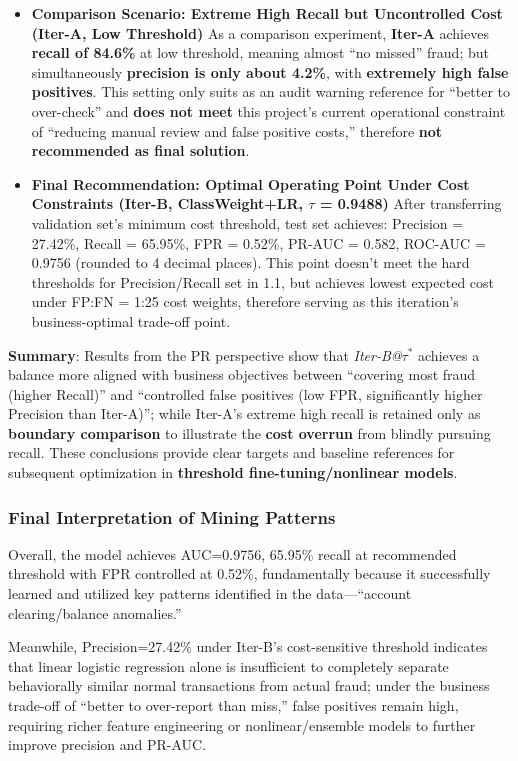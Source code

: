 \documentclass[sigplan,screen]{acmart}
\begin{document}
\begin{itemize}
\item \textbf{Comparison Scenario: Extreme High Recall but Uncontrolled Cost (Iter-A, Low Threshold)} As a comparison experiment, \textbf{Iter-A} achieves \textbf{recall of 84.6\%} at low threshold, meaning almost ``no missed'' fraud; but simultaneously \textbf{precision is only about 4.2\%}, with \textbf{extremely high false positives}. This setting only suits as an audit warning reference for ``better to over-check'' and \textbf{does not meet} this project's current operational constraint of ``reducing manual review and false positive costs,'' therefore \textbf{not recommended as final solution}.

\item \textbf{Final Recommendation: Optimal Operating Point Under Cost Constraints (Iter-B, ClassWeight+LR, $\tau$ = 0.9488)} After transferring validation set's minimum cost threshold, test set achieves: Precision = 27.42\%, Recall = 65.95\%, FPR = 0.52\%, PR-AUC = 0.582, ROC-AUC = 0.9756 (rounded to 4 decimal places). This point doesn't meet the hard thresholds for Precision/Recall set in 1.1, but achieves lowest expected cost under FP:FN = 1:25 cost weights, therefore serving as this iteration's business-optimal trade-off point.
\end{itemize}

\textbf{Summary}: Results from the PR perspective show that \textit{Iter-B@$\tau^*$} achieves a balance more aligned with business objectives between ``covering most fraud (higher Recall)'' and ``controlled false positives (low FPR, significantly higher Precision than Iter-A)''; while Iter-A's extreme high recall is retained only as \textbf{boundary comparison} to illustrate the \textbf{cost overrun} from blindly pursuing recall. These conclusions provide clear targets and baseline references for subsequent optimization in \textbf{threshold fine-tuning/nonlinear models}.

\subsubsection{Final Interpretation of Mining Patterns}

Overall, the model achieves AUC=0.9756, 65.95\% recall at recommended threshold with FPR controlled at 0.52\%, fundamentally because it successfully learned and utilized key patterns identified in the data---``account clearing/balance anomalies.''

Meanwhile, Precision=27.42\% under Iter-B's cost-sensitive threshold indicates that linear logistic regression alone is insufficient to completely separate behaviorally similar normal transactions from actual fraud; under the business trade-off of ``better to over-report than miss,'' false positives remain high, requiring richer feature engineering or nonlinear/ensemble models to further improve precision and PR-AUC.
\end{document}
